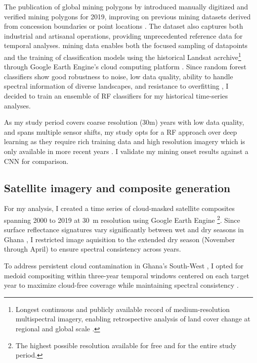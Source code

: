 \documentclass[]{interact}
\begin{document}
The publication of global mining polygons by \citet{maus2020globalscale,maus2022update} introduced manually digitized and verified mining polygons for 2019, improving on previous mining datasets derived from concession boundaries or point locations \citep{maus2022update}. The dataset also captures both industrial and artisanal operations, providing unprecedented reference data for temporal analyses. \citet{maus2022update} mining data enables both the focused sampling of datapoints and the training of classification models using the historical Landsat acrchive\footnote{Longest continuous and publicly available record of medium-resolution multispectral imagery, enabling retrospective analysis of land cover change at regional and global scale \citep{potapov2022Global,roy2016Characterization}.} through Google Earth Engine's cloud computing platform \citep{gorelick2017Google}. Since random forest classifiers show good robustness to noise, low data quality, ability to handle spectral information of diverse landscapes, and resistance to overfitting \citep{belgiu2016Random,rodriguez-galiano2012assessment,gislason2006Random,breiman2001Random,phiri2017Developments}, I decided to train an ensemble of RF classifiers for my historical time-series analyses. 

As my study period covers coarse resolution (30m) years with low data quality, and spans multiple sensor shifts, my study opts for a RF approach over deep learning as they require rich training data and high resolution imagery which is only available in more recent years \citep{kattenborn2021Review,nursamsi2024Remote,gallwey2020Sentinel2}. I validate my mining onset results against a CNN for comparison.

\subsection{Satellite imagery and composite generation}
For my analysis, I created a time series of cloud-masked satellite composites spanning 2000 to 2019 at 30~m resolution using Google Earth Engine \citep{gorelick2017Google}\footnote{The highest possible resolution available for free and for the entire study period.}. Since surface reflectance signatures vary significantly between wet and dry seasons in Ghana \citep{flood2013Seasonal}, I restricted image aquisition to the extended dry season (November through April) to ensure spectral consistency across years.

To address persistent cloud contamination in Ghana's South-West \citep{barenblitt2021large}, I opted for medoid compositing within three-year temporal windows centered on each target year to maximize cloud-free coverage while maintaining spectral consistency \citep{phan2020Land,flood2013Seasonal}.
\end{document}
